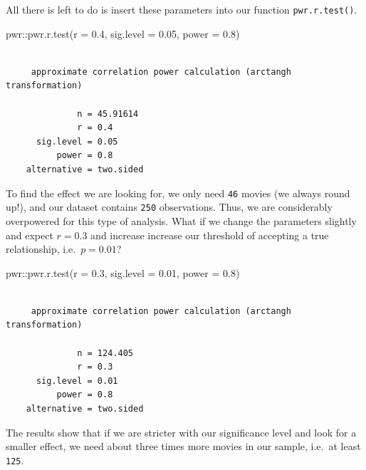\documentclass[
  letterpaper,
]{krantz}
\makeatletter
\newenvironment{Shaded}{\begin{snugshade}}{\end{snugshade}}
\newcommand{\AttributeTok}[1]{\textcolor[rgb]{0.40,0.45,0.13}{#1}}
\newcommand{\FloatTok}[1]{\textcolor[rgb]{0.68,0.00,0.00}{#1}}
\newcommand{\FunctionTok}[1]{\textcolor[rgb]{0.28,0.35,0.67}{#1}}
\newcommand{\NormalTok}[1]{\textcolor[rgb]{0.00,0.23,0.31}{#1}}
\newcommand{\SpecialCharTok}[1]{\textcolor[rgb]{0.37,0.37,0.37}{#1}}
\newenvironment{kframe}{%
\medskip{}
\setlength{\fboxsep}{.8em}
 \def\at@end@of@kframe{}%
 \ifinner\ifhmode%
  \def\at@end@of@kframe{\end{minipage}}%
  \begin{minipage}{\columnwidth}%
 \fi\fi%
 \def\FrameCommand##1{\hskip\@totalleftmargin \hskip-\fboxsep
 \colorbox{shadecolor}{##1}\hskip-\fboxsep
     \hskip-\linewidth \hskip-\@totalleftmargin \hskip\columnwidth}%
 \MakeFramed {\advance\hsize-\width
   \@totalleftmargin\z@ \linewidth\hsize
   \@setminipage}}%
 {\par\unskip\endMakeFramed%
 \at@end@of@kframe}
\renewenvironment{Shaded}{\begin{kframe}}{\end{kframe}}
\makeatother
\begin{document}
All there is left to do is insert these parameters into our function
\texttt{pwr.r.test()}.

\begin{Shaded}
\begin{Highlighting}[]
\NormalTok{pwr}\SpecialCharTok{::}\FunctionTok{pwr.r.test}\NormalTok{(}\AttributeTok{r =} \FloatTok{0.4}\NormalTok{,}
                \AttributeTok{sig.level =} \FloatTok{0.05}\NormalTok{,}
                \AttributeTok{power =} \FloatTok{0.8}\NormalTok{)}
\end{Highlighting}
\end{Shaded}

\begin{verbatim}

     approximate correlation power calculation (arctangh transformation) 

              n = 45.91614
              r = 0.4
      sig.level = 0.05
          power = 0.8
    alternative = two.sided
\end{verbatim}

To find the effect we are looking for, we only need \texttt{46} movies
(we always round up!), and our dataset contains \texttt{250}
observations. Thus, we are considerably overpowered for this type of
analysis. What if we change the parameters slightly and expect
\(r = 0.3\) and increase increase our threshold of accepting a true
relationship, i.e.~\(p = 0.01\)?

\begin{Shaded}
\begin{Highlighting}[]
\NormalTok{pwr}\SpecialCharTok{::}\FunctionTok{pwr.r.test}\NormalTok{(}\AttributeTok{r =} \FloatTok{0.3}\NormalTok{,}
                \AttributeTok{sig.level =} \FloatTok{0.01}\NormalTok{,}
                \AttributeTok{power =} \FloatTok{0.8}\NormalTok{)}
\end{Highlighting}
\end{Shaded}

\begin{verbatim}

     approximate correlation power calculation (arctangh transformation) 

              n = 124.405
              r = 0.3
      sig.level = 0.01
          power = 0.8
    alternative = two.sided
\end{verbatim}

The results show that if we are stricter with our significance level and
look for a smaller effect, we need about three times more movies in our
sample, i.e.~at least \texttt{125}.
\end{document}
